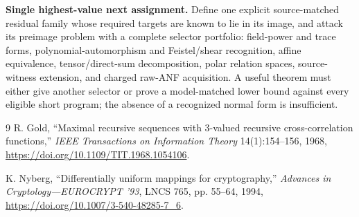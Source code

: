 \documentclass[11pt]{article}
\begin{document}
\textbf{Single highest-value next assignment.}
Define one explicit source-matched residual family whose required targets are
known to lie in its image, and attack its preimage problem with a complete
selector portfolio: field-power and trace forms, polynomial-automorphism and
Feistel/shear recognition, affine equivalence, tensor/direct-sum
decomposition, polar relation spaces, source-witness extension, and charged
raw-ANF acquisition.  A useful theorem must either give another selector or
prove a model-matched lower bound against every eligible short program; the
absence of a recognized normal form is insufficient.

\begin{thebibliography}{9}
R. Gold, ``Maximal recursive sequences with 3-valued recursive
cross-correlation functions,'' \emph{IEEE Transactions on Information
Theory} 14(1):154--156, 1968,
\url{https://doi.org/10.1109/TIT.1968.1054106}.

K. Nyberg, ``Differentially uniform mappings for cryptography,''
\emph{Advances in Cryptology---EUROCRYPT '93}, LNCS 765, pp. 55--64, 1994,
\url{https://doi.org/10.1007/3-540-48285-7_6}.
\end{thebibliography}
\end{document}
